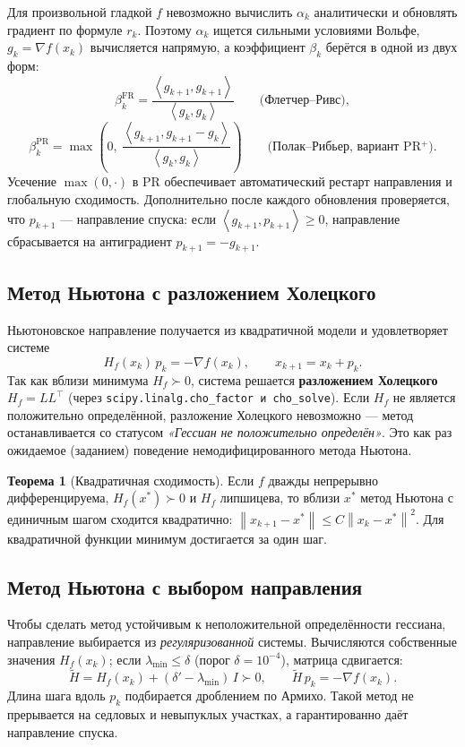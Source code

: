 \documentclass[a4paper,12pt]{article}
\newcommand{\norm}[1]{\left\|#1\right\|}
\newcommand{\grad}{\nabla}
\newcommand{\inner}[2]{\left\langle #1, #2 \right\rangle}
\theoremstyle{definition}
\newtheorem{theorem}{Теорема}[section]
\begin{document}
Для произвольной гладкой $f$ невозможно вычислить $\alpha_k$ аналитически и обновлять градиент
по формуле $r_k$. Поэтому $\alpha_k$ ищется сильными условиями Вольфе, $g_k = \grad f(x_k)$
вычисляется напрямую, а коэффициент $\beta_k$ берётся в одной из двух форм:
\[
    \beta_k^{\text{FR}} = \frac{\inner{g_{k+1}}{g_{k+1}}}{\inner{g_k}{g_k}}
    \qquad\text{(Флетчер--Ривс)},
\]
\[
    \beta_k^{\text{PR}} = \max\!\left(0,\
    \frac{\inner{g_{k+1}}{g_{k+1} - g_k}}{\inner{g_k}{g_k}}\right)
    \qquad\text{(Полак--Рибьер, вариант PR$^+$)}.
\]
Усечение $\max(0,\cdot)$ в PR обеспечивает автоматический рестарт направления и глобальную
сходимость. Дополнительно после каждого обновления проверяется, что $p_{k+1}$ — направление
спуска: если $\inner{g_{k+1}}{p_{k+1}} \geq 0$, направление сбрасывается на антиградиент
$p_{k+1} = -g_{k+1}$.

\subsection{Метод Ньютона с разложением Холецкого}

Ньютоновское направление получается из квадратичной модели и удовлетворяет системе
\[
    H_f(x_k)\, p_k = -\grad f(x_k), \qquad x_{k+1} = x_k + p_k.
\]
Так как вблизи минимума $H_f \succ 0$, система решается \textbf{разложением Холецкого}
$H_f = L L^\top$ (через \texttt{scipy.linalg.cho\_factor и cho\_solve}). Если $H_f$ не является
положительно определённой, разложение Холецкого невозможно — метод останавливается со статусом
\textit{«Гессиан не положительно определён»}. Это как раз ожидаемое (заданием) поведение
немодифицированного метода Ньютона.

\begin{theorem}[Квадратичная сходимость]
    Если $f$ дважды непрерывно дифференцируема, $H_f(x^*) \succ 0$ и $H_f$ липшицева, то вблизи
    $x^*$ метод Ньютона с единичным шагом сходится квадратично:
    $\norm{x_{k+1} - x^*} \leq C\norm{x_k - x^*}^2$. Для квадратичной функции минимум достигается
    за один шаг.
\end{theorem}

\subsection{Метод Ньютона с выбором направления}

Чтобы сделать метод устойчивым к неположительной определённости гессиана, направление выбирается
из \emph{регуляризованной} системы. Вычисляются собственные значения $H_f(x_k)$; если
$\lambda_{\min} \leq \delta$ (порог $\delta = 10^{-4}$), матрица сдвигается:
\[
    \tilde H = H_f(x_k) + (\delta' - \lambda_{\min})\, I \succ 0, \qquad
    \tilde H\, p_k = -\grad f(x_k).
\]
Длина шага вдоль $p_k$ подбирается дроблением по Армихо. Такой метод не прерывается на седловых
и невыпуклых участках, а гарантированно даёт направление спуска.
\end{document}
